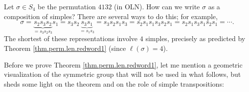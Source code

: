 \begin{example}
Let $\sigma\in S_{4}$ be the permutation $4132$ (in OLN). How can we write
$\sigma$ as a composition of simples? There are several ways to do this; for
example,%
\[
\sigma=\underbrace{s_{2}s_{3}s_{2}}_{=s_{3}s_{2}s_{3}}s_{1}=s_{3}%
s_{2}\underbrace{s_{3}s_{1}}_{=s_{1}s_{3}}=s_{3}s_{2}s_{1}s_{3}=s_{2}%
s_{1}s_{1}s_{3}s_{2}s_{1}=s_{2}s_{1}s_{3}s_{1}s_{2}s_{1}=\cdots.
\]
The shortest of these representations involve $4$ simples, precisely as
predicted by Theorem \ref{thm.perm.len.redword1} (since $\ell\left(
\sigma\right)  =4$).
\end{example}

Before we prove Theorem \ref{thm.perm.len.redword1}, let me mention a
geometric visualization of the symmetric group that will not be used in what
follows, but sheds some light on the theorem and on the role of simple transpositions:

